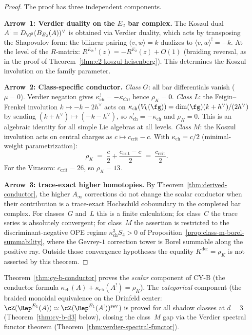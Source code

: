 \begin{proof}
 The proof has three independent components.

\medskip
\noindent\textbf{Arrow~1: Verdier duality on the $E_2$ bar complex.}
The Koszul dual $A^! = D_{\C^2}(B_{E_2}(A))^\vee$ is obtained via Verdier
duality, which acts by transposing the Shapovalov form: the bilinear pairing
$\langle v, w \rangle = k$ dualizes to $\langle v, w \rangle^! = -k$.
At the level of the $R$-matrix: $R^{E_2,!}(z) = -R^{E_2}(z) + O(1)$
(braiding reversal, as in the proof of
Theorem~\ref{thm:e2-koszul-heisenberg}).
This determines the Koszul involution on the family parameter.

\medskip
\noindent\textbf{Arrow~2: Class-specific conductor.}
\emph{Class $G$}: all bar differentials vanish ($\mu = 0$). Verdier
negation gives $\kappa_{\mathrm{ch}}^! = -\kappa_{\mathrm{ch}}$, hence
$\rho_K = 0$.
\emph{Class $L$}: the Feigin--Frenkel involution $k \mapsto -k - 2h^\vee$
acts on $\kappa_{\mathrm{ch}}(V_k(\fg)) = \dim(\fg)(k + h^\vee)/(2h^\vee)$
by sending $(k + h^\vee) \mapsto (-k - h^\vee)$, so
$\kappa_{\mathrm{ch}}^! = -\kappa_{\mathrm{ch}}$ and $\rho_K = 0$.
This is an algebraic identity for all simple Lie algebras at all levels.
\emph{Class $M$}: the Koszul involution acts on central charges as
$c \mapsto c_{\mathrm{crit}} - c$. With $\kappa_{\mathrm{ch}} = c/2$
(minimal-weight parametrization):
\[
 \rho_K \;=\; \frac{c}{2} + \frac{c_{\mathrm{crit}} - c}{2}
 \;=\; \frac{c_{\mathrm{crit}}}{2}.
\]
For the Virasoro: $c_{\mathrm{crit}} = 26$, so $\rho_K = 13$.

\medskip
\noindent\textbf{Arrow~3: trace-exact higher homotopies.}
By Theorem~\ref{thm:derived-conductor}, the higher $A_\infty$
corrections do not change the scalar conductor when their contribution
is a trace-exact Hochschild coboundary in the completed bar complex.
For classes~$G$ and~$L$ this is a finite calculation; for class~$C$
the trace series is absolutely convergent; for class~$M$ the assertion
is restricted to the discriminant-negative OPE regime
$\kappa_{\mathrm{ch}}^3 S_4>0$ of
Proposition~\ref{prop:class-m-borel-summability}, where the
Gevrey-$1$ correction tower is Borel summable along the positive ray.
Outside those convergence hypotheses the equality
$K^{\mathrm{der}}=\rho_K$ is not asserted by this theorem.

\end{proof}

\begin{remark}
\label{rem:cy-b-decomposition}
Theorem~\ref{thm:cy-b-conductor} proves the \emph{scalar} component of CY-B
(the conductor formula $\kappa_{\mathrm{ch}}(A) + \kappa_{\mathrm{ch}}(A^!) = \rho_K$).
The \emph{categorical} component (the braided monoidal equivalence
on the Drinfeld center:
$\cZ(\Rep^{E_1}(A)) \simeq \cZ(\Rep^{E_1}(A^!))^{\mathrm{rev}}$)
is proved for all
shadow classes at $d = 3$ (Theorem~\ref{thm:cy-b-d3} below), closing the
class~$M$ gap via the Verdier spectral functor theorem
(Theorem~\ref{thm:verdier-spectral-functor}).
\end{remark}


